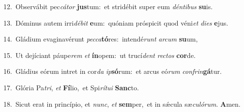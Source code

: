 {\numbfont\textcolor{\numbcolor}{12.}}~Observábit pec\-\textit{cá}\-\textit{tor} \textbf{jus}\-tum:~\star et stridébit super eum \textit{dén}\-\textit{ti}\textit{bus} \textbf{su}\-is.\par
{\numbfont\textcolor{\numbcolor}{13.}}~Dóminus autem irri\-\textit{dé}\-\textit{bit} \textbf{e}\-um:~\star quóniam próspicit quod véni\textit{et} \textit{di}\-\textit{es} \textbf{e}\-jus.\par
{\numbfont\textcolor{\numbcolor}{14.}}~Gládium evaginavérunt \textit{pec}\-\textit{ca}\textbf{tó}res:~\star intendé\textit{runt} \textit{ar}\-\textit{cum} \textbf{su}\-um,\par
{\numbfont\textcolor{\numbcolor}{15.}}~Ut dejíciant páupe\textit{rem} \textit{et} \textbf{ín}\-opem:~\star ut trucí\textit{dent} \textit{rec}\-\textit{tos} \textbf{cor}\-de.\par
{\numbfont\textcolor{\numbcolor}{16.}}~Gládius eórum intret in cor\textit{da} \textit{ip}\-\textbf{só}rum:~\star et arcus eó\textit{rum} \textit{con}\-\textit{frin}\textbf{gá}tur.\par
{\numbfont\textcolor{\numbcolor}{17.}}~Glória Pa\-\textit{tri}\-, \textit{et} \textbf{Fí}\-lio,~\star et Spi\-\textit{rí}\-\textit{tu}\textit{i} \textbf{Sanc}\-to.\par
{\numbfont\textcolor{\numbcolor}{18.}}~Sicut erat in princípio, et \textit{nunc}\-, \textit{et} \textbf{sem}\-per,~\star et in sǽcula sæ\-\textit{cu}\-\textit{ló}\textit{rum}. \textbf{A}\-men.\par
